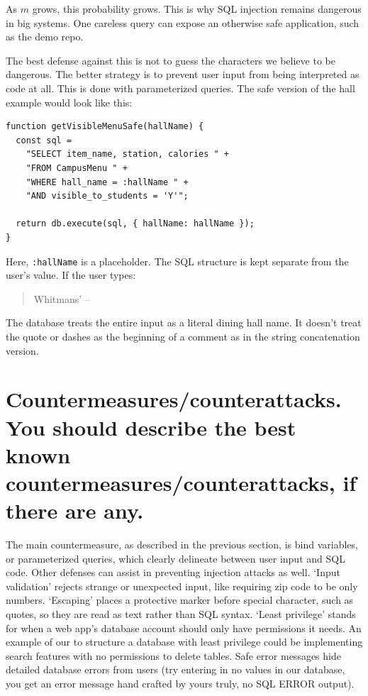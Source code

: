 \documentclass[12pt]{article}
\begin{document}
As \(m\) grows, this probability grows. This is why SQL injection remains dangerous in big systems. One careless query can expose an otherwise safe application, such as the demo repo.

The best defense against this is not to guess the characters we believe to be dangerous. The better strategy is to prevent user input from being interpreted as code at all. This is done with parameterized queries. The safe version of the hall example would look like this:

\begin{lstlisting}
function getVisibleMenuSafe(hallName) {
  const sql =
    "SELECT item_name, station, calories " +
    "FROM CampusMenu " +
    "WHERE hall_name = :hallName " +
    "AND visible_to_students = 'Y'";

  return db.execute(sql, { hallName: hallName });
}
\end{lstlisting}

Here, \texttt{:hallName} is a placeholder. The SQL structure is kept separate from the user’s value. If the user types:

\begin{quote}
Whitmans' --
\end{quote}

The database treats the entire input as a literal dining hall name. It doesn’t treat the quote or dashes as the beginning of a comment as in the string concatenation version.

\section{Countermeasures/counterattacks. You should describe the best known countermeasures/counterattacks, if there are any.}

The main countermeasure, as described in the previous section, is bind variables, or parameterized queries, which clearly delineate between user input and SQL code. Other defenses can assist in preventing injection attacks as well. ‘Input validation’ rejects strange or unexpected input, like requiring zip code to be only numbers. ‘Escaping’ places a protective marker before special character, such as quotes, so they are read as text rather than SQL syntax. ‘Least privilege’ stands for when a web app’s database account should only have permissions it needs. An example of our to structure a database with least privilege could be implementing search features with no permissions to delete tables. Safe error messages hide detailed database errors from users (try entering in no values in our database, you get an error message hand crafted by yours truly, no SQL ERROR output).
\end{document}
